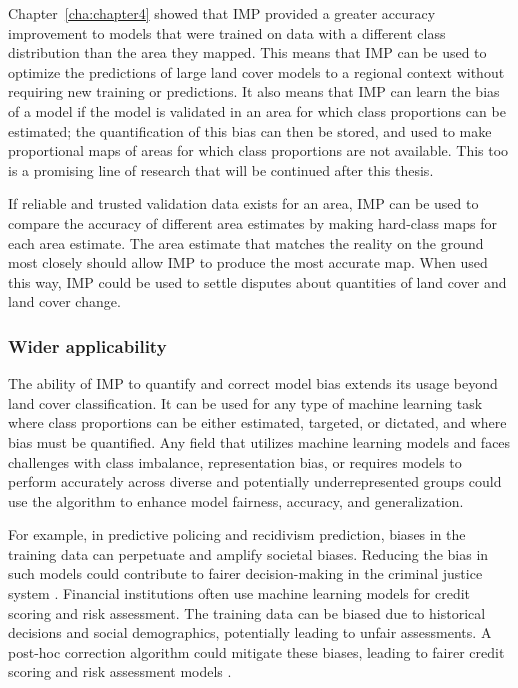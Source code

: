         Chapter\@~\ref{cha:chapter4} showed that IMP provided a greater accuracy improvement to models that were trained on data with a different class distribution than the area they mapped. This means that IMP can be used to optimize the predictions of large land cover models to a regional context without requiring new training or predictions. It also means that IMP can learn the bias of a model if the model is validated in an area for which class proportions can be estimated; the quantification of this bias can then be stored, and used to make proportional maps of areas for which class proportions are not available. This too is a promising line of research that will be continued after this thesis. 

        If reliable and trusted validation data exists for an area, IMP can be used to compare the accuracy of different area estimates by making hard-class maps for each area estimate. The area estimate that matches the reality on the ground most closely should allow IMP to produce the most accurate map. When used this way, IMP could be used to settle disputes about quantities of land cover and land cover change.

        \subsubsection{Wider applicability}
        
        The ability of IMP to quantify and correct model bias extends its usage beyond land cover classification. It can be used for any type of machine learning task where class proportions can be either estimated, targeted, or dictated, and where bias must be quantified. Any field that utilizes machine learning models and faces challenges with class imbalance, representation bias, or requires models to perform accurately across diverse and potentially underrepresented groups could use the algorithm to enhance model fairness, accuracy, and generalization.
        
        For example, in predictive policing and recidivism prediction, biases in the training data can perpetuate and amplify societal biases. Reducing the bias in such models could contribute to fairer decision-making in the criminal justice system \citep{berk2021fairness, dressel2018accuracy}. Financial institutions often use machine learning models for credit scoring and risk assessment. The training data can be biased due to historical decisions and social demographics, potentially leading to unfair assessments. A post-hoc correction algorithm could mitigate these biases, leading to fairer credit scoring and risk assessment models \citep{chen2018why, kamiran2012data}. 

